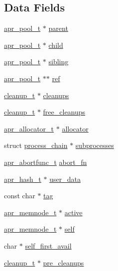 \subsection*{Data Fields}
\begin{DoxyCompactItemize}
\item 
\hyperlink{structapr__pool__t}{apr\+\_\+pool\+\_\+t} $\ast$ \hyperlink{structapr__pool__t_a28dd6b4a817021d09833589dc453b12e}{parent}
\item 
\hyperlink{structapr__pool__t}{apr\+\_\+pool\+\_\+t} $\ast$ \hyperlink{structapr__pool__t_a724088896d7a149fb32dd14489006afa}{child}
\item 
\hyperlink{structapr__pool__t}{apr\+\_\+pool\+\_\+t} $\ast$ \hyperlink{structapr__pool__t_adb7173775273b72cdbd1c7890ca6f5cb}{sibling}
\item 
\hyperlink{structapr__pool__t}{apr\+\_\+pool\+\_\+t} $\ast$$\ast$ \hyperlink{structapr__pool__t_ae92a7a95ba59b5c8f088561b03340218}{ref}
\item 
\hyperlink{structcleanup__t}{cleanup\+\_\+t} $\ast$ \hyperlink{structapr__pool__t_aa21246e1da3382b8e5c2b591d30b6624}{cleanups}
\item 
\hyperlink{structcleanup__t}{cleanup\+\_\+t} $\ast$ \hyperlink{structapr__pool__t_a47fcb8d854d73019492ec84e6b84dc88}{free\+\_\+cleanups}
\item 
\hyperlink{structapr__allocator__t}{apr\+\_\+allocator\+\_\+t} $\ast$ \hyperlink{structapr__pool__t_a0b966157de565de389783a833e6baf15}{allocator}
\item 
struct \hyperlink{structprocess__chain}{process\+\_\+chain} $\ast$ \hyperlink{structapr__pool__t_aedc6fb98956f528445d370f72b5fcbd1}{subprocesses}
\item 
\hyperlink{group__apr__pools_ga370a939349adf6d1438068e2fc69a0dd}{apr\+\_\+abortfunc\+\_\+t} \hyperlink{structapr__pool__t_a82c4bbe64a436265e0cc050be10b7377}{abort\+\_\+fn}
\item 
\hyperlink{structapr__hash__t}{apr\+\_\+hash\+\_\+t} $\ast$ \hyperlink{structapr__pool__t_a57f166689174741c1775ebbab732a71d}{user\+\_\+data}
\item 
const char $\ast$ \hyperlink{structapr__pool__t_a20079f6dcd17e1e15199c919f56c1b46}{tag}
\item 
\hyperlink{structapr__memnode__t}{apr\+\_\+memnode\+\_\+t} $\ast$ \hyperlink{structapr__pool__t_a41f1f002f20026500f98af3e5bbb1e97}{active}
\item 
\hyperlink{structapr__memnode__t}{apr\+\_\+memnode\+\_\+t} $\ast$ \hyperlink{structapr__pool__t_aa742b251c8799d886709246ab1cafc53}{self}
\item 
char $\ast$ \hyperlink{structapr__pool__t_abe113f61048164e90b17bb0b456e3900}{self\+\_\+first\+\_\+avail}
\item 
\hyperlink{structcleanup__t}{cleanup\+\_\+t} $\ast$ \hyperlink{structapr__pool__t_aa4b703920518e9d10ec6f13c9e4c61e5}{pre\+\_\+cleanups}
\end{DoxyCompactItemize}


